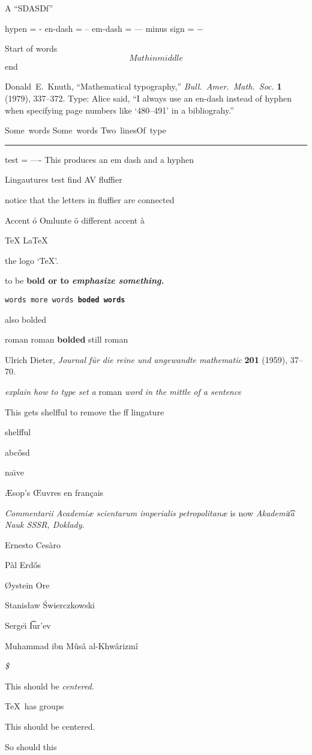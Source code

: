 \documentclass{article}
\begin{document}
A ``SDASDf''

hypen = -
en-dash = --
em-dash = ---
minus sign = $-$

\noindent{}Start of words $$Math in middle$$ end

Donald~E.~Knuth, ``Mathematical typography,'' {\it Bull.~Amer.~Math.~Soc.} {\bf 1} (1979), 337--372.
Type: 
Alice said, ``I always use an en-dash
instead of  hyphen when specifying page
numbers like `480--491' in a 
bibliograhy.''

\hbox{Some words}
\hbox{Some words}
\vbox{\hbox{Two lines}\hbox{Of type}}
\hrule
\vskip3in

test = ----
This produces an em dash and a hyphen

Lingautures test\newline
    find\newline
    AV\newline
    fluffier\newline

notice that the letters in fluffier are connected

Accent
\'o
Omlunte
\"o
different accent
\`a

\TeX\newline
\LaTeX\newline

the logo `\TeX'.

to be \bf bold or to \sl emphasize \rm something.

\tt words more words \bf boded words

also bolded\rm

\rm roman roman {\bf bolded} still roman

Ulrich Dieter, {\sl Journal f\"ur die reine und angewandte mathematic}\/  {\bf 201} (1959), 37--70.

{\sl explain how to type set a\/} roman {\sl word in the mittle of a sentence}



This gets shelfful to remove the ff lingature

shelf{}ful

abc\H{o}sd

na\"\i{}ve

{\AE}sop's {\OE}uvres en fran\c{c}ais

{\sl Commentarii Academi{\ae} scientarum
imperialis petropolitan{\ae}\/} is now
{\sl Akademi{\t{\i}a} Nauk SSSR, Doklady}.

Ernesto Ces{\`a}ro

P{\`a}l Erd\H{o}s

{\O}ystein Ore

Stanis{\l}aw {\'S}wierczkowski

Serge{\u{\i}} {\t{Iu}}r'ev

Muhammad ibn M{\^u}s{\^a} al-Khw{\^a}rizm{\^i}

{\it \$}

\centerline{This should be {\it centered}.}
\centerline{\TeX\  has groups}
\centerline{This should be {centered}.}
\centerline{So should this}

\end{document}

